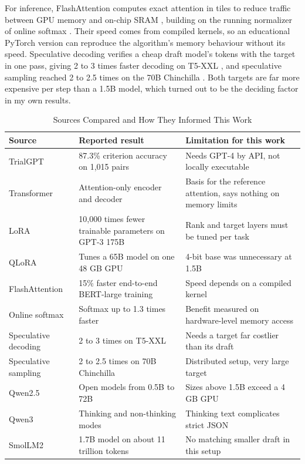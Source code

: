 \documentclass[conference]{IEEEtran}
\begin{document}
For inference, FlashAttention computes exact attention in tiles to reduce traffic between GPU memory and on-chip SRAM \cite{dao2022flashattention}, building on the running normalizer of online softmax \cite{milakov2018online}. Their speed comes from compiled kernels, so an educational PyTorch version can reproduce the algorithm's memory behaviour without its speed. Speculative decoding verifies a cheap draft model's tokens with the target in one pass, giving 2 to 3 times faster decoding on T5-XXL \cite{leviathan2023fast}, and speculative sampling reached 2 to 2.5 times on the 70B Chinchilla \cite{chen2023accelerating}. Both targets are far more expensive per step than a 1.5B model, which turned out to be the deciding factor in my own results.

\begin{table}[t]
\caption{Sources Compared and How They Informed This Work}
\label{tab:literature}
\centering
\footnotesize
\begin{tabular}{@{}p{1.75cm}p{2.95cm}p{2.85cm}@{}}
\toprule
Source & Reported result & Limitation for this work \\
\midrule
TrialGPT \cite{jin2023trialgpt} & 87.3\% criterion accuracy on 1,015 pairs & Needs GPT-4 by API, not locally executable \\
Transformer \cite{vaswani2017attention} & Attention-only encoder and decoder & Basis for the reference attention, says nothing on memory limits \\
LoRA \cite{hu2022lora} & 10,000 times fewer trainable parameters on GPT-3 175B & Rank and target layers must be tuned per task \\
QLoRA \cite{dettmers2023qlora} & Tunes a 65B model on one 48 GB GPU & 4-bit base was unnecessary at 1.5B \\
FlashAttention \cite{dao2022flashattention} & 15\% faster end-to-end BERT-large training & Speed depends on a compiled kernel \\
Online softmax \cite{milakov2018online} & Softmax up to 1.3 times faster & Benefit measured on hardware-level memory access \\
Speculative decoding \cite{leviathan2023fast} & 2 to 3 times on T5-XXL & Needs a target far costlier than its draft \\
Speculative sampling \cite{chen2023accelerating} & 2 to 2.5 times on 70B Chinchilla & Distributed setup, very large target \\
Qwen2.5 \cite{qwen2025report} & Open models from 0.5B to 72B & Sizes above 1.5B exceed a 4 GB GPU \\
Qwen3 \cite{qwen3report} & Thinking and non-thinking modes & Thinking text complicates strict JSON \\
SmolLM2 \cite{benallal2025smollm2} & 1.7B model on about 11 trillion tokens & No matching smaller draft in this setup \\
\bottomrule
\end{tabular}
\end{table}
\end{document}
